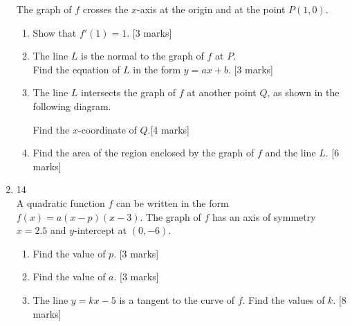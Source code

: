 \documentclass[12pt, twoside]{article}
\begin{document}
\begin{enumerate}
        The graph of $f$ crosses the $x$-axis at the origin and at the point $P(1,0)$.
        \begin{enumerate}
          \item Show that $f'(1)=1$. [3 marks]
          \item The line $L$ is the normal to the graph of $f$ at $P$.\\
          Find the equation of $L$ in the form $y=ax+b$. [3 marks]
          \item The line $L$ intersects the graph of $f$ at another point $Q$, as shown in the following diagram.
            \begin{center}
            \end{center}
            Find the $x$-coordinate of $Q$.[4 marks]
            \item Find the area of the region enclosed by the graph of $f$ and the line $L$.  [6 marks]
        \end{enumerate}

        \item 14\\
        A quadratic function $f$ can be written in the form  $f(x)=a(x-p)(x-3)$. The graph of $f$ has an axis of symmetry $x=2.5$ and $y$-intercept at $(0,-6)$.
        \begin{enumerate}
          \item Find the value of $p$. [3 marks]
          \item Find the value of $a$. [3 marks]
          \item The line $y=kx-5$ is a tangent to the curve of $f$. Find the values of $k$. [8 marks]
        \end{enumerate}


\end{enumerate}
\end{document}
